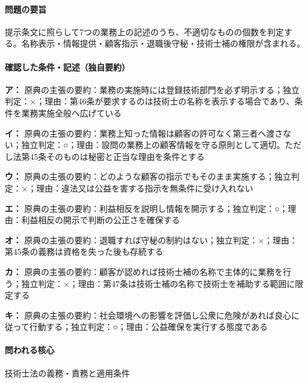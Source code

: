 \paragraph{問題の要旨} 提示条文に照らして7つの業務上の記述のうち、不適切なものの個数を判定する。名称表示・情報提供・顧客指示・退職後守秘・技術士補の権限が含まれる。

\paragraph{確認した条件・記述（独自要約）}\mbox{}\par

\noindent\textbf{ア：} 原典の主張の要約：業務の実施時には登録技術部門を必ず明示する；独立判定：×；理由：第46条が要求するのは技術士の名称を表示する場合であり、条件を業務実施全般へ広げている\par

\noindent\textbf{イ：} 原典の主張の要約：業務上知った情報は顧客の許可なく第三者へ渡さない；独立判定：○；理由：設問の業務上の顧客情報を守る原則として適切。ただし法第45条そのものは秘密と正当な理由を条件とする\par

\noindent\textbf{ウ：} 原典の主張の要約：どのような顧客の指示でもそのまま実施する；独立判定：×；理由：違法又は公益を害する指示を無条件に受け入れない\par

\noindent\textbf{エ：} 原典の主張の要約：利益相反を説明し情報を開示する；独立判定：○；理由：利益相反の開示で判断の公正さを確保する\par

\noindent\textbf{オ：} 原典の主張の要約：退職すれば守秘の制約はない；独立判定：×；理由：第45条の義務は資格を失った後も存続する\par

\noindent\textbf{カ：} 原典の主張の要約：顧客が認めれば技術士補の名称で主体的に業務を行う；独立判定：×；理由：第47条は技術士補の名称で技術士を補助する範囲に限定する\par

\noindent\textbf{キ：} 原典の主張の要約：社会環境への影響を評価し公衆に危険があれば良心に従って行動する；独立判定：○；理由：公益確保を実行する態度である\par

\paragraph{問われる核心} 技術士法の義務・責務と適用条件

